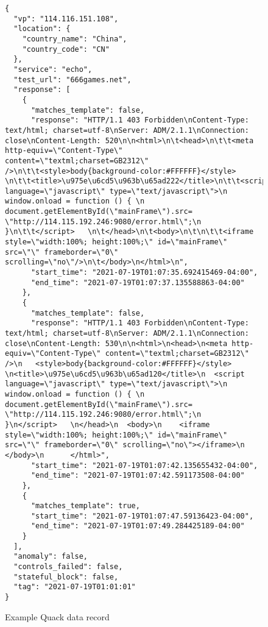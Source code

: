 \begin{figure}[hbt]
\begin{verbatim}
{
  "vp": "114.116.151.108",
  "location": {
    "country_name": "China",
    "country_code": "CN"
  },
  "service": "echo",
  "test_url": "666games.net",
  "response": [
    {
      "matches_template": false,
      "response": "HTTP/1.1 403 Forbidden\nContent-Type: text/html; charset=utf-8\nServer: ADM/2.1.1\nConnection: close\nContent-Length: 520\n\n<html>\n\t<head>\n\t\t<meta http-equiv=\"Content-Type\" content=\"textml;charset=GB2312\" />\n\t\t<style>body{background-color:#FFFFFF}</style> \n\t\t<title>\u975e\u6cd5\u963b\u65ad222</title>\n\t\t<script language=\"javascript\" type=\"text/javascript\">\n         window.onload = function () { \n           document.getElementById(\"mainFrame\").src= \"http://114.115.192.246:9080/error.html\";\n            }\n\t\t</script>   \n\t</head>\n\t<body>\n\t\n\t\t<iframe style=\"width:100%; height:100%;\" id=\"mainFrame\" src=\"\" frameborder=\"0\" scrolling=\"no\"/>\n\t</body>\n</html>\n",
      "start_time": "2021-07-19T01:07:35.692415469-04:00",
      "end_time": "2021-07-19T01:07:37.135588863-04:00"
    },
    {
      "matches_template": false,
      "response": "HTTP/1.1 403 Forbidden\nContent-Type: text/html; charset=utf-8\nServer: ADM/2.1.1\nConnection: close\nContent-Length: 530\n\n<html>\n<head>\n<meta http-equiv=\"Content-Type\" content=\"textml;charset=GB2312\" />\n   <style>body{background-color:#FFFFFF}</style> \n<title>\u975e\u6cd5\u963b\u65ad120</title>\n  <script language=\"javascript\" type=\"text/javascript\">\n         window.onload = function () { \n           document.getElementById(\"mainFrame\").src= \"http://114.115.192.246:9080/error.html\";\n            }\n</script>   \n</head>\n  <body>\n    <iframe style=\"width:100%; height:100%;\" id=\"mainFrame\" src=\"\" frameborder=\"0\" scrolling=\"no\"></iframe>\n    </body>\n      </html>",
      "start_time": "2021-07-19T01:07:42.135655432-04:00",
      "end_time": "2021-07-19T01:07:42.591173508-04:00"
    },
    {
      "matches_template": true,
      "start_time": "2021-07-19T01:07:47.59136423-04:00",
      "end_time": "2021-07-19T01:07:49.284425189-04:00"
    }
  ],
  "anomaly": false,
  "controls_failed": false,
  "stateful_block": false,
  "tag": "2021-07-19T01:01:01"
}
\end{verbatim}
\caption{Example Quack data record}
\label{example-echo}
\end{figure}

